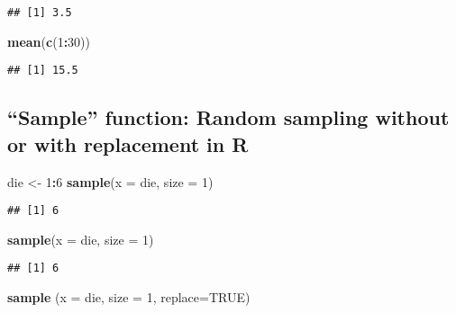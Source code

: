 \documentclass[
]{article}
\newenvironment{Shaded}{\begin{snugshade}}{\end{snugshade}}
\newcommand{\AttributeTok}[1]{\textcolor[rgb]{0.13,0.29,0.53}{#1}}
\newcommand{\ConstantTok}[1]{\textcolor[rgb]{0.56,0.35,0.01}{#1}}
\newcommand{\DecValTok}[1]{\textcolor[rgb]{0.00,0.00,0.81}{#1}}
\newcommand{\FunctionTok}[1]{\textcolor[rgb]{0.13,0.29,0.53}{\textbf{#1}}}
\newcommand{\NormalTok}[1]{#1}
\newcommand{\OtherTok}[1]{\textcolor[rgb]{0.56,0.35,0.01}{#1}}
\newcommand{\SpecialCharTok}[1]{\textcolor[rgb]{0.81,0.36,0.00}{\textbf{#1}}}
\begin{document}
\begin{verbatim}
## [1] 3.5
\end{verbatim}

\begin{Shaded}
\begin{Highlighting}[]
\FunctionTok{mean}\NormalTok{(}\FunctionTok{c}\NormalTok{(}\DecValTok{1}\SpecialCharTok{:}\DecValTok{30}\NormalTok{))}
\end{Highlighting}
\end{Shaded}

\begin{verbatim}
## [1] 15.5
\end{verbatim}

\subsection{``Sample'' function: Random sampling without or with
replacement in
R}\label{sample-function-random-sampling-without-or-with-replacement-in-r}

\begin{Shaded}
\begin{Highlighting}[]
\NormalTok{die }\OtherTok{\textless{}{-}} \DecValTok{1}\SpecialCharTok{:}\DecValTok{6}
\FunctionTok{sample}\NormalTok{(}\AttributeTok{x =}\NormalTok{ die, }\AttributeTok{size =} \DecValTok{1}\NormalTok{)}
\end{Highlighting}
\end{Shaded}

\begin{verbatim}
## [1] 6
\end{verbatim}

\begin{Shaded}
\begin{Highlighting}[]
\FunctionTok{sample}\NormalTok{(}\AttributeTok{x =}\NormalTok{ die, }\AttributeTok{size =} \DecValTok{1}\NormalTok{)}
\end{Highlighting}
\end{Shaded}

\begin{verbatim}
## [1] 6
\end{verbatim}

\begin{Shaded}
\begin{Highlighting}[]
\FunctionTok{sample}\NormalTok{ (}\AttributeTok{x =}\NormalTok{ die, }\AttributeTok{size =} \DecValTok{1}\NormalTok{, }\AttributeTok{replace=}\ConstantTok{TRUE}\NormalTok{)}
\end{Highlighting}
\end{Shaded}
\end{document}
